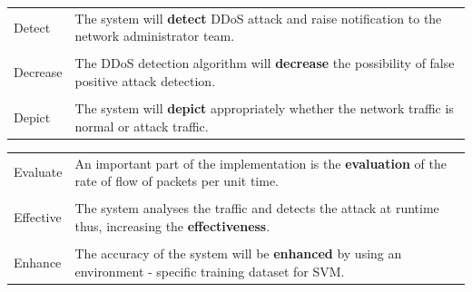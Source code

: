 \documentclass[12pt,a4paper,final]{report}
\begin{document}
\vspace*{1cm}
\begin{center}
\begin{tabular}{|m{2cm}|m{7cm}|}
\hline

Detect & The system will \textbf{detect} DDoS attack and raise notification to the network administrator team. \\

&\\

Decrease & The DDoS detection algorithm will \textbf{decrease} the possibility of false positive attack detection. \\

&\\

Depict & The system will \textbf{depict} appropriately whether the network traffic is normal or attack traffic. \\

\hline
\end{tabular}
\end{center}

\newpage
\begin{center}
\begin{tabular}{|m{2cm}|m{7cm}|}
\hline

Evaluate & An important part of the implementation is the \textbf{evaluation} of the rate of flow of packets per unit time. \\

&\\

Effective & The system analyses the traffic and detects the attack at runtime thus, increasing the \textbf{effectiveness}. \\

&\\

Enhance & The accuracy of the system will be \textbf{enhanced} by using an environment - specific training dataset for SVM. \\

\hline
\end{tabular}
\end{center}
\end{document}
